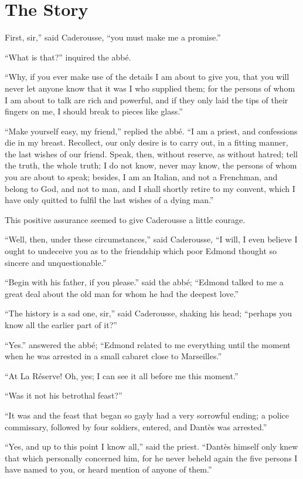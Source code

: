 \chapter{The Story}

First, sir,” said Caderousse, “you must make me a promise.”

“What is that?” inquired the abbé.

“Why, if you ever make use of the details I am about to give you, that
you will never let anyone know that it was I who supplied them; for the
persons of whom I am about to talk are rich and powerful, and if they
only laid the tips of their fingers on me, I should break to pieces
like glass.”

“Make yourself easy, my friend,” replied the abbé. “I am a priest, and
confessions die in my breast. Recollect, our only desire is to carry
out, in a fitting manner, the last wishes of our friend. Speak, then,
without reserve, as without hatred; tell the truth, the whole truth; I
do not know, never may know, the persons of whom you are about to
speak; besides, I am an Italian, and not a Frenchman, and belong to
God, and not to man, and I shall shortly retire to my convent, which I
have only quitted to fulfil the last wishes of a dying man.”

This positive assurance seemed to give Caderousse a little courage.

“Well, then, under these circumstances,” said Caderousse, “I will, I
even believe I ought to undeceive you as to the friendship which poor
Edmond thought so sincere and unquestionable.”

“Begin with his father, if you please.” said the abbé; “Edmond talked
to me a great deal about the old man for whom he had the deepest love.”

“The history is a sad one, sir,” said Caderousse, shaking his head;
“perhaps you know all the earlier part of it?”

“Yes.” answered the abbé; “Edmond related to me everything until the
moment when he was arrested in a small cabaret close to Marseilles.”

“At La Réserve! Oh, yes; I can see it all before me this moment.”

“Was it not his betrothal feast?”

“It was and the feast that began so gayly had a very sorrowful ending;
a police commissary, followed by four soldiers, entered, and Dantès was
arrested.”

“Yes, and up to this point I know all,” said the priest. “Dantès
himself only knew that which personally concerned him, for he never
beheld again the five persons I have named to you, or heard mention of
anyone of them.”

